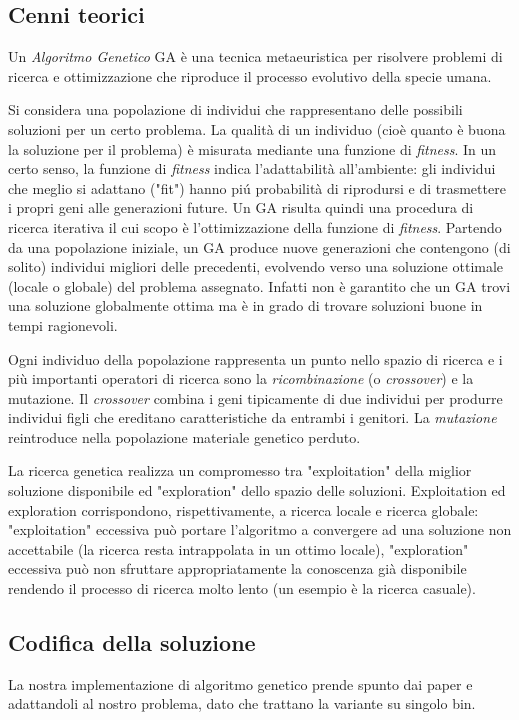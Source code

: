 \subsection{Cenni teorici}
Un \textit{Algoritmo Genetico} GA è una tecnica metaeuristica per risolvere problemi di ricerca e ottimizzazione che riproduce il processo evolutivo della specie umana.

Si considera una popolazione di individui che rappresentano delle possibili soluzioni per un certo problema. La qualità di un individuo (cioè quanto è buona la soluzione per il problema) è misurata mediante una funzione di \emph{fitness}. In un certo senso, la funzione di \emph{fitness} indica l’adattabilità all’ambiente: gli individui che meglio si adattano ("fit") hanno piú probabilità di riprodursi e di trasmettere i propri geni alle generazioni future. Un GA risulta quindi una procedura di ricerca iterativa il cui scopo è l’ottimizzazione della funzione di \emph{fitness}. Partendo da una popolazione iniziale, un GA produce nuove generazioni che contengono (di solito) individui migliori delle precedenti, evolvendo verso una soluzione ottimale (locale o globale) del problema assegnato. Infatti non è garantito che un GA trovi una soluzione globalmente ottima ma è in grado di trovare soluzioni buone in tempi ragionevoli.

Ogni individuo della popolazione rappresenta un punto nello spazio di ricerca e i più importanti operatori di ricerca sono la \emph{ricombinazione} (o \emph{crossover}) e la mutazione. Il \emph{crossover} combina i geni tipicamente di due individui per produrre individui figli che ereditano caratteristiche da entrambi i genitori. La \emph{mutazione} reintroduce nella popolazione materiale genetico perduto.

La ricerca genetica realizza un compromesso tra "exploitation" della miglior soluzione disponibile ed "exploration" dello spazio delle soluzioni. Exploitation ed exploration corrispondono, rispettivamente, a ricerca locale e ricerca globale: "exploitation" eccessiva può portare l’algoritmo a convergere ad una soluzione non accettabile (la ricerca resta intrappolata in un ottimo locale), "exploration" eccessiva può non sfruttare appropriatamente la conoscenza già disponibile rendendo il processo di ricerca molto lento (un esempio è la ricerca casuale).

\subsection{Codifica della soluzione}
La nostra implementazione di algoritmo genetico prende spunto dai paper \cite{Jakobs} e \cite{Hopper} adattandoli al nostro problema, dato che trattano la variante su singolo bin.

